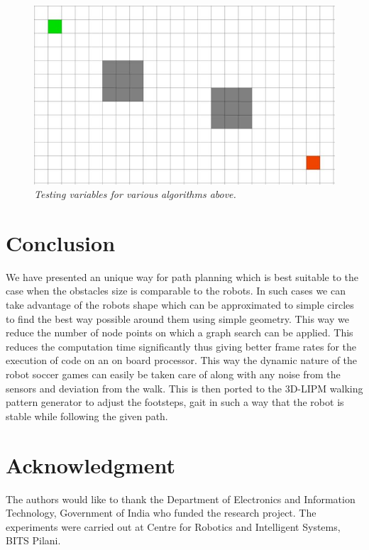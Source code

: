 \documentclass[letterpaper, 10 pt, conference]{ieeeconf}  %
\begin{document}
\begin{figure}[h]  
\begin{center}  
\includegraphics[scale=0.4]{testbed.jpg}  
\caption{\small \sl Testing variables for various algorithms above.\label{fig:test3}}  
\end{center}  
\end{figure}


\section{Conclusion}
We have presented an unique way for path planning which is best suitable to the case when the obstacles size is comparable to the robots. In such cases we can take advantage of the robots shape which can be approximated to simple circles to find the best way possible around them using simple geometry. This way we reduce the number of node points on which a graph search can be applied. This reduces the computation time significantly thus giving better frame rates for the execution of code on an on board processor. This way the dynamic nature of the robot soccer games can easily be taken care of along with any noise from the sensors and deviation from the walk. This is then ported to the 3D-LIPM walking pattern generator to adjust the footsteps, gait in such a way that the robot is stable while following the given path. 
\\




\section{Acknowledgment}


The authors would like to thank the Department of Electronics and Information Technology, Government of India who funded the research project. The experiments were carried out at Centre for Robotics and Intelligent Systems, BITS Pilani.
\end{document}
